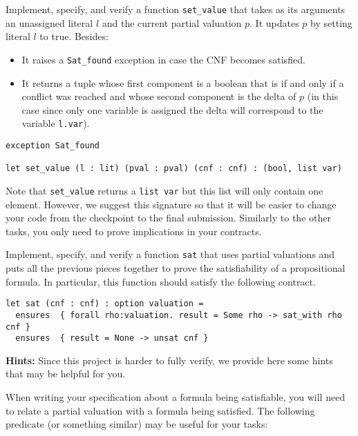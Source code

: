\documentclass[11pt]{article}
\begin{document}
\begin{task}[5 pts] Implement, specify, and verify a function \verb|set_value| that takes as its arguments an unassigned literal $l$ and the current partial valuation $p$. It updates $p$ by setting literal $l$ to true. Besides:

\begin{itemize}
\item It raises a \verb|Sat_found| exception in case the CNF becomes satisfied.
\item It returns a tuple whose first component is a boolean that is \true{} if and only if a conflict was reached and whose second component is the delta of $p$ (in this case since only one variable is assigned the delta will correspond to the variable \texttt{l.var}).
\end{itemize}

\begin{lstlisting}
exception Sat_found

let set_value (l : lit) (pval : pval) (cnf : cnf) : (bool, list var)
\end{lstlisting}

Note that \texttt{set\_value} returns a \texttt{list var} but this list will only contain one element. However, we suggest this signature so that it will be easier to change your code from the checkpoint to the final submission. Similarly to the other tasks, you only need to prove implications in your contracts.
\end{task}

\begin{task}[30] Implement, specify, and verify a function \verb|sat| that uses partial valuations and puts all the previous pieces together to prove the satisfiability of a propositional formula.  In particular, this function should satisfy the following contract.

\begin{lstlisting}
let sat (cnf : cnf) : option valuation =
  ensures  { forall rho:valuation. result = Some rho -> sat_with rho cnf }
  ensures  { result = None -> unsat cnf }
\end{lstlisting}
\end{task}

\textbf{Hints:} Since this project is harder to fully verify, we provide here some hints that may be helpful for you.

When writing your specification about a formula being satisfiable, you will need to relate a partial valuation with a formula being satisfied. The following predicate (or something similar) may be useful for your tasks:
\end{document}
